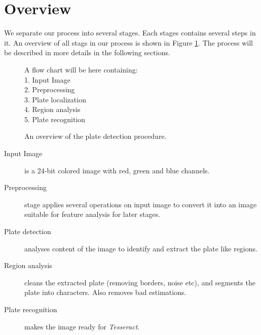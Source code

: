 \documentclass{standalone}
\begin{document}
\section{Overview}
We separate our process into several stages. Each stages contains several steps in it. An overview of all stags in our process is shown in Figure \ref{fig:ProcessOverview}. The process will be described in more details in the following sections.

\begin{figure} 
	\centering
    {\small
      A flow chart will be here containing:\\
      1. Input Image\\
      2. Preprocessing\\
      3. Plate localization\\
      4. Region analysis\\
      5. Plate recognition
    }
	\caption{An overview of the plate detection procedure.} 
	\label{fig:ProcessOverview}
\end{figure}

\begin{description}
\item [Input Image] is a 24-bit colored image with red, green and blue channels.
\item [Preprocessing] stage applies several operations on input image to convert it into an image suitable for feature analysis for later stages.
\item [Plate detection] analyses content of the image to identify and extract the plate like regions.
\item [Region analysis] cleans the extracted plate (removing borders, noise etc), and segments the plate into characters. Also removes bad estimations.
\item [Plate recognition] makes the image ready for {\it Tesseract}.
\end{description}
\end{document}
